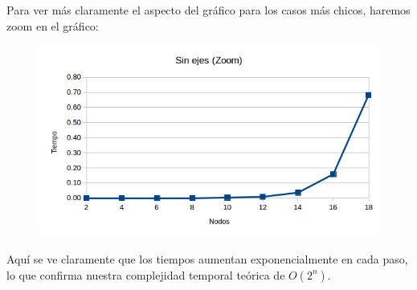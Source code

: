 Para ver m\'as claramente el aspecto del gr\'afico para los casos m\'as chicos, haremos zoom en el gr\'afico:\\

\begin{figure}[h!]
   \begin{center}
 	\includegraphics[scale=0.7]{imagenes/exacto/Vacio(zoom).png}
   \end{center}
 \end{figure}

Aqu\'i se ve claramente que los tiempos aumentan exponencialmente en cada paso, lo que confirma nuestra complejidad temporal te\'orica de $O(2^n)$.\\
